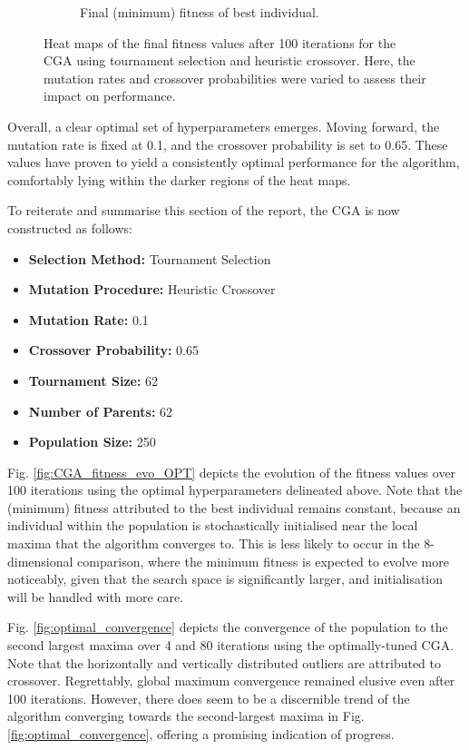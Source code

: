 \documentclass[10pt]{article}
\begin{document}
\begin{multicols}{2}
\begin{figure}[H]
\begin{subfigure}{0.48\textwidth}
        \caption{Final (minimum) fitness of best individual.}
        \label{fig:CGA_contour_tournament_Heuristic Crossover_MIN}
    \end{subfigure}
    \captionsetup{justification=centering}
    \caption{Heat maps of the final fitness values after 100 iterations for the CGA using tournament selection and heuristic crossover. Here, the mutation rates and crossover probabilities were varied to assess their impact on performance.}
    \label{fig:CGA_contour_rates}
\end{figure}

Overall, a clear optimal set of hyperparameters emerges. Moving forward, the mutation rate is fixed at 0.1, and the crossover probability is set to 0.65. These values have proven to yield a consistently optimal performance for the algorithm, comfortably lying within the darker regions of the heat maps.

To reiterate and summarise this section of the report, the CGA is now constructed as follows:

\begin{itemize}
    \item \textbf{Selection Method:} Tournament Selection
    \item \textbf{Mutation Procedure:} Heuristic Crossover
    \item \textbf{Mutation Rate:} 0.1
    \item \textbf{Crossover Probability:} 0.65
    \item \textbf{Tournament Size:} 62
    \item \textbf{Number of Parents:} 62
    \item \textbf{Population Size:} 250
\end{itemize}

Fig. \ref{fig:CGA_fitness_evo_OPT} depicts the evolution of the fitness values over 100 iterations using the optimal hyperparameters delineated above. Note that the (minimum) fitness attributed to the best individual remains constant, because an individual within the population is stochastically initialised near the local maxima that the algorithm converges to. This is less likely to occur in the 8-dimensional comparison, where the minimum fitness is expected to evolve more noticeably,  given that the search space is significantly larger, and initialisation will be handled with more care.

Fig. \ref{fig:optimal_convergence} depicts the convergence of the population to the second largest maxima over 4 and 80 iterations using the optimally-tuned CGA. Note that the horizontally and vertically distributed outliers are attributed to crossover. Regrettably, global maximum convergence remained elusive even after 100 iterations. However, there does seem to be a discernible trend of the algorithm converging towards the second-largest maxima in Fig. \ref{fig:optimal_convergence}, offering a promising indication of progress. 


\end{multicols}
\end{document}
